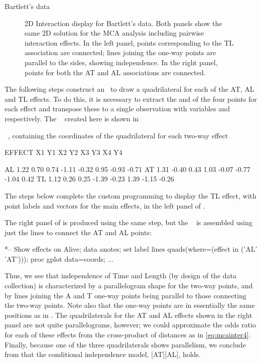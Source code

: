 \begin{Example}[bartlett]{Bartlett's data}
\begin{figure}[htb]
\begin{minipage}[t]{.49\linewidth}
 \end{minipage}
 \caption[2D Interaction display for Bartlett's data]{2D Interaction display for Bartlett's data.  Both panels show the same 2D solution for the MCA analysis including pairwise interaction effects.  In the left panel, points corresponding to the TL association are connected; lines joining the one-way
points are parallel to the sides, showing independence.
In the right panel, points for both the AT and AL associations are connected.}\label{fig:mcabart2}
\end{figure}
The following steps construct an \ADS\ to draw a quadrilateral for
each of the AT, AL and TL effects.
To do this, it is necessary to extract the  and 
of the four points for each effect and transpose these to a single
observation with variables  and  respectively.
The \Dset\  created here is shown in 

\begin{Output}[htb]
\caption{\Dset\ , containing the coordinates of the quadrilateral for each two-way effect}\label{out:mcabart4}
\begin{output}
   EFFECT     X1     Y1     X2     Y2     X3     Y3     X4     Y4

     AL     1.22   0.70   0.74  -1.11  -0.32   0.95  -0.93  -0.71
     AT     1.31  -0.40   0.43   1.03  -0.07  -0.77  -1.04   0.42
     TL     1.12   0.26   0.25  -1.39  -0.23   1.39  -1.15  -0.26
\end{output}
\end{Output}
The steps below complete the custom programming to display the TL
effect, with point labels and vectors for the main effects, in the left panel of .

The right panel of  is produced
using the same  step,
but the \ADS\  is assembled using just the
lines to connect the AT and AL points:
\begin{listing}
*-- Show effects on Alive;
data anotes;
   set label lines quads(where=(effect in ('AL' 'AT')));
proc gplot data=coords;
   ...
\end{listing}

Thus, we see that independence of Time and Length (by design of the
data collection) is characterized by a parallelogram shape for the
two-way points, and by lines joining the A and T one-way points
being parallel to those connecting the two-way points.
Note also that the one-way points are in essentially the same positions
as in .
The quadrilaterals for the AT and AL effects shown in the right panel
are not quite parallelograms, however;  we could approximate the odds
ratio for each of these effects from the cross-product of distances
as in \eqref{eq:mcainter4}.
Finally, because one of the three quadrilaterals shows parallelism,
we conclude from  that the conditional independence
model, [AT][AL], holds.


\end{Example}
